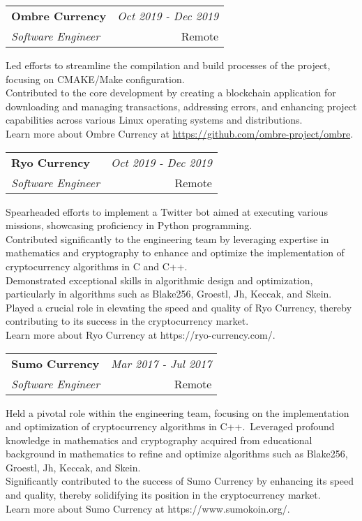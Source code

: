 \documentclass[a4paper,10pt]{article}
\makeatletter
\newcommand{\resumeSubheading}[4]{
	\vspace{0.5mm}\item
	\begin{tabular*}{0.98\textwidth}[t]{l@{\extracolsep{\fill}}r}
		\textbf{#1} & \textit{\footnotesize{#4}} \\
		\textit{\footnotesize{#3}} &  \footnotesize{#2}\\
	\end{tabular*}
	\vspace{-2.4mm}
}
\newcommand{\resumeItemListStart}{\begin{justify}\begin{itemize}[leftmargin=3ex, rightmargin=2ex, noitemsep,labelsep=1.2mm,itemsep=0mm]\small}
\newcommand{\resumeItemListEnd}{\end{itemize}\end{justify}\vspace{-2mm}}
\makeatother
\begin{document}
\vspace{-1mm}
\resumeSubheading
{Ombre Currency}{Remote}
{Software Engineer}{Oct 2019 - Dec 2019}
\resumeItemListStart
Led efforts to streamline the compilation and build processes of the project, focusing on CMAKE/Make configuration. \\
Contributed to the core development by creating a blockchain application for downloading and managing transactions, addressing errors, and enhancing project capabilities across various Linux operating systems and distributions. \\
Learn more about Ombre Currency at \url{https://github.com/ombre-project/ombre}.
\resumeItemListEnd

\vspace{-1mm}
\resumeSubheading
{Ryo Currency}{Remote}
{Software Engineer}{Oct 2019 - Dec 2019}
\resumeItemListStart
Spearheaded efforts to implement a Twitter bot aimed at executing various missions, showcasing proficiency in Python programming.\\
Contributed significantly to the engineering team by leveraging expertise in mathematics and cryptography to enhance and optimize the implementation of cryptocurrency algorithms in C and C++.\\
Demonstrated exceptional skills in algorithmic design and optimization, particularly in algorithms such as Blake256, Groestl, Jh, Keccak, and Skein.\\
Played a crucial role in elevating the speed and quality of Ryo Currency, thereby contributing to its success in the cryptocurrency market.\\
Learn more about Ryo Currency at https://ryo-currency.com/.
\resumeItemListEnd

\vspace{-1mm}
\resumeSubheading{Sumo Currency}{Remote}
{Software Engineer}{Mar 2017 - Jul 2017}
\resumeItemListStart
Held a pivotal role within the engineering team, focusing on the implementation and optimization of cryptocurrency algorithms in C++.\
Leveraged profound knowledge in mathematics and cryptography acquired from educational background in mathematics to refine and optimize algorithms such as Blake256, Groestl, Jh, Keccak, and Skein.\\
Significantly contributed to the success of Sumo Currency by enhancing its speed and quality, thereby solidifying its position in the cryptocurrency market.\\
Learn more about Sumo Currency at https://www.sumokoin.org/.
\resumeItemListEnd
\end{document}
